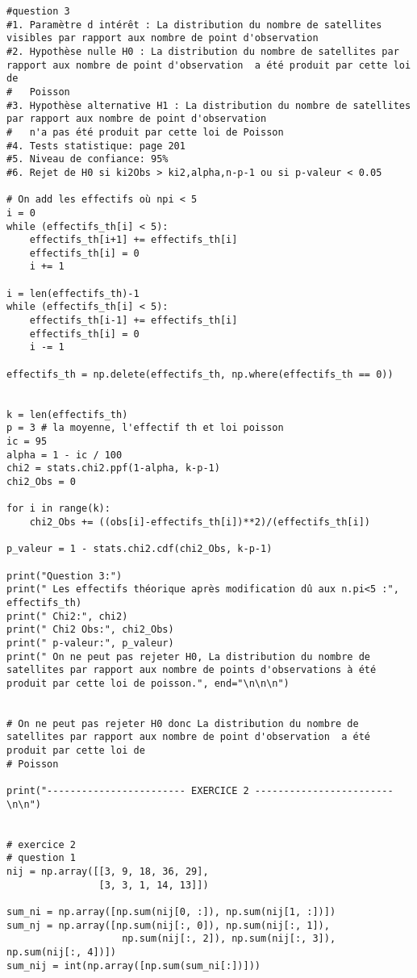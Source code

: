 \begin{lstlisting}[style=myPython, caption=Code Python complet TP5, frame=lines]
#question 3
#1. Paramètre d intérêt : La distribution du nombre de satellites visibles par rapport aux nombre de point d'observation
#2. Hypothèse nulle H0 : La distribution du nombre de satellites par rapport aux nombre de point d'observation  a été produit par cette loi de
#   Poisson
#3. Hypothèse alternative H1 : La distribution du nombre de satellites par rapport aux nombre de point d'observation
#   n'a pas été produit par cette loi de Poisson
#4. Tests statistique: page 201
#5. Niveau de confiance: 95%
#6. Rejet de H0 si ki2Obs > ki2,alpha,n-p-1 ou si p-valeur < 0.05

# On add les effectifs où npi < 5
i = 0
while (effectifs_th[i] < 5):
    effectifs_th[i+1] += effectifs_th[i]
    effectifs_th[i] = 0
    i += 1

i = len(effectifs_th)-1
while (effectifs_th[i] < 5):
    effectifs_th[i-1] += effectifs_th[i]
    effectifs_th[i] = 0
    i -= 1

effectifs_th = np.delete(effectifs_th, np.where(effectifs_th == 0))


k = len(effectifs_th)
p = 3 # la moyenne, l'effectif th et loi poisson
ic = 95
alpha = 1 - ic / 100
chi2 = stats.chi2.ppf(1-alpha, k-p-1)
chi2_Obs = 0

for i in range(k):
    chi2_Obs += ((obs[i]-effectifs_th[i])**2)/(effectifs_th[i])

p_valeur = 1 - stats.chi2.cdf(chi2_Obs, k-p-1)

print("Question 3:")
print(" Les effectifs théorique après modification dû aux n.pi<5 :", effectifs_th)
print(" Chi2:", chi2)
print(" Chi2 Obs:", chi2_Obs)
print(" p-valeur:", p_valeur)
print(" On ne peut pas rejeter H0, La distribution du nombre de satellites par rapport aux nombre de points d'observations à été produit par cette loi de poisson.", end="\n\n\n")


# On ne peut pas rejeter H0 donc La distribution du nombre de satellites par rapport aux nombre de point d'observation  a été produit par cette loi de
# Poisson

print("------------------------ EXERCICE 2 ------------------------\n\n")


# exercice 2
# question 1
nij = np.array([[3, 9, 18, 36, 29],
                [3, 3, 1, 14, 13]])

sum_ni = np.array([np.sum(nij[0, :]), np.sum(nij[1, :])])
sum_nj = np.array([np.sum(nij[:, 0]), np.sum(nij[:, 1]),
                    np.sum(nij[:, 2]), np.sum(nij[:, 3]), np.sum(nij[:, 4])])
sum_nij = int(np.array([np.sum(sum_ni[:])]))


\end{lstlisting}
